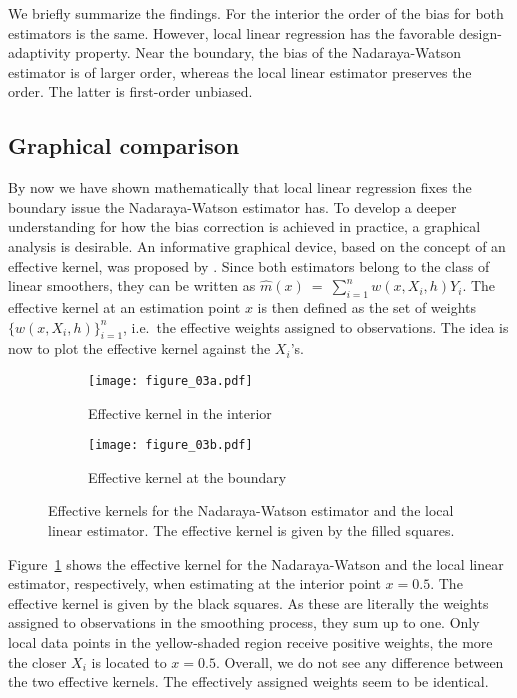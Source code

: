 We briefly summarize the findings.
For the interior the order of the bias for both estimators is the same.
However, local linear regression has the favorable design-adaptivity property.
Near the boundary, the bias of the Nadaraya-Watson estimator is of larger order, whereas the local linear estimator preserves the order.
The latter is first-order unbiased.

\subsection{Graphical comparison}

By now we have shown mathematically that local linear regression fixes the boundary issue the Nadaraya-Watson estimator has.
To develop a deeper understanding for how the bias correction is achieved in practice, a graphical analysis is desirable.
An informative graphical device, based on the concept of an effective kernel, was proposed by \textcite{Hastie_1993}.
Since both estimators belong to the class of linear smoothers, they can be written as $\hat{m}(x)~=~\sum_{i = 1}^{n} w(x, X_i, h) Y_i$.
The effective kernel at an estimation point $x$ is then defined as the set of weights $\{w(x, X_i, h)\}_{i = 1}^n$,
i.e.\ the effective weights assigned to observations.
The idea is now to plot the effective kernel against the $X_i$'s.

\begin{figure}[t]
	\centering
	\begin{subfigure}{0.75\textwidth}
		\centering
		\texttt{[image: figure\_03a.pdf]}
		\caption{Effective kernel in the interior}
		\label{fig:effective_kernel_interior}
	\end{subfigure}
	
	\begin{subfigure}{0.75\textwidth}
		\centering
		\texttt{[image: figure\_03b.pdf]}
		\caption{Effective kernel at the boundary}
		\label{fig:effective_kernel_boundary}
	\end{subfigure}
	\caption{Effective kernels for the Nadaraya-Watson estimator and the local linear estimator. The effective kernel is given by the filled squares.}
	\label{fig:effective_kernel}
\end{figure}

Figure~\ref{fig:effective_kernel_interior} shows the effective kernel for the Nadaraya-Watson and the local linear estimator, respectively, when estimating at the interior point $x = 0.5$.
The effective kernel is given by the black squares.
As these are literally the weights assigned to observations in the smoothing process, they sum up to one.
Only local data points in the yellow-shaded region receive positive weights, the more the closer $X_i$ is located to $x = 0.5$.
Overall, we do not see any difference between the two effective kernels.
The effectively assigned weights seem to be identical.

